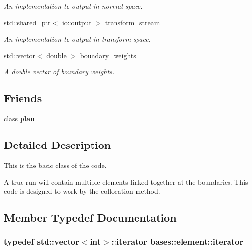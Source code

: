 \begin{DoxyCompactItemize}
\begin{DoxyCompactList}\small\item\em An implementation to output in normal space. \end{DoxyCompactList}\item 
\hypertarget{classbases_1_1element_a9f154ce2a7a6cb41810a412d56dc0d05}{std\-::shared\-\_\-ptr$<$ \hyperlink{classio_1_1output}{io\-::output} $>$ \hyperlink{classbases_1_1element_a9f154ce2a7a6cb41810a412d56dc0d05}{transform\-\_\-stream}}\label{classbases_1_1element_a9f154ce2a7a6cb41810a412d56dc0d05}

\begin{DoxyCompactList}\small\item\em An implementation to output in transform space. \end{DoxyCompactList}\item 
\hypertarget{classbases_1_1element_a4bfaed78e051894cdcb980272953a8df}{std\-::vector$<$ double $>$ \hyperlink{classbases_1_1element_a4bfaed78e051894cdcb980272953a8df}{boundary\-\_\-weights}}\label{classbases_1_1element_a4bfaed78e051894cdcb980272953a8df}

\begin{DoxyCompactList}\small\item\em A double vector of boundary weights. \end{DoxyCompactList}\end{DoxyCompactItemize}
\subsection*{Friends}
\begin{DoxyCompactItemize}
\item 
\hypertarget{classbases_1_1element_a09a337604df64eed6477718d9f120f91}{class {\bfseries plan}}\label{classbases_1_1element_a09a337604df64eed6477718d9f120f91}

\end{DoxyCompactItemize}


\subsection{Detailed Description}
This is the basic class of the code. 



 A true run will contain multiple elements linked together at the boundaries. This code is designed to work by the collocation method. 

\subsection{Member Typedef Documentation}
\hypertarget{classbases_1_1element_ad6c297b8fbb3ea61a1a7048f0fbf7d89}{
\subsubsection[{iterator}]{\setlength{\rightskip}{0pt plus 5cm}typedef std\-::vector$<$int$>$\-::{\bf iterator} {\bf bases\-::element\-::iterator}}}\label{classbases_1_1element_ad6c297b8fbb3ea61a1a7048f0fbf7d89}


